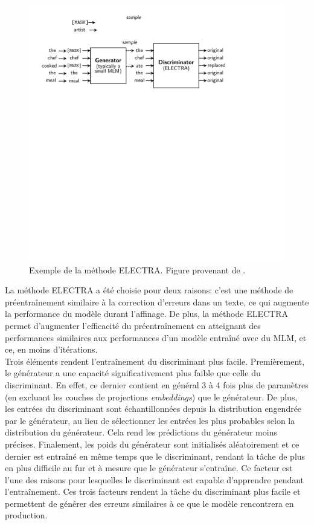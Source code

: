 \documentclass[12pt,twoside,rapport]{dms}
\theoremstyle{definition}
\numberwithin{equation}{section}
\numberwithin{table}{chapter}
\numberwithin{figure}{chapter}
\begin{document}
\begin{figure}
	\begin{center}
		\includegraphics[width=1.0\textwidth]{figures/electra_entr.pdf}
	\end{center}
	\caption{Exemple de la méthode ELECTRA. Figure provenant de \cite{clark2020electrapretrainingtextencoders}.}
	\label{fig:electra}
\end{figure}


La méthode ELECTRA a été choisie pour deux raisons: c'est une méthode de
préentraînement similaire à la correction d'erreurs dans un texte, ce qui
augmente la performance du modèle durant l'affinage. De plus, la méthode
ELECTRA permet d'augmenter l'efficacité du préentraînement en atteignant des
performances similaires aux performances d'un modèle entraîné avec du MLM, et
ce, en moins d'itérations. \\

Trois éléments rendent l'entraînement du discriminant plus facile.
Premièrement, le générateur a une capacité significativement plus faible que
celle du discriminant. En effet, ce dernier contient en général 3 à 4 fois plus de
paramètres (en excluant les couches de projections \textit{embeddings}) que le
générateur. De plus, les entrées du discriminant sont échantillonnées depuis la
distribution engendrée par le générateur, au lieu de sélectionner les entrées
les plus probables selon la distribution du générateur. Cela rend les
prédictions du générateur moins précises. Finalement, les poids du générateur
sont initialisés aléatoirement et ce dernier est entraîné en même temps que le
discriminant, rendant la tâche de plus en plus difficile au fur et à mesure que
le générateur s'entraîne. Ce facteur est l'une des raisons pour lesquelles le
discriminant est capable d'apprendre pendant l'entraînement. Ces trois
facteurs rendent la tâche du discriminant plus facile et permettent de générer
des erreurs similaires à ce que le modèle rencontrera en production.\\
\end{document}
